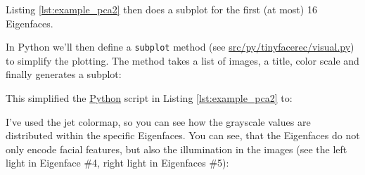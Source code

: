 	

\else
	
\fi

\ifx\python\undefined 

Listing \ref{lst:example_pca2} then does a subplot for the first (at most) 16 Eigenfaces. 

\else 

In Python we'll then define a \lstinline|subplot| method (see \url{src/py/tinyfacerec/visual.py}) to simplify the plotting. The method takes a list of images, a title, color scale and finally generates a subplot:



This simplified the \href{http://www.python.org}{Python} script in Listing \ref{lst:example_pca2} to:
\fi

\ifx\python\undefined
	
\else
	
\fi

I've used the jet colormap, so you can see how the grayscale values are distributed within the specific Eigenfaces. You can see, that the Eigenfaces do not only encode facial features, but also the illumination in the images (see the left light in Eigenface \#4, right light in Eigenfaces \#5):

